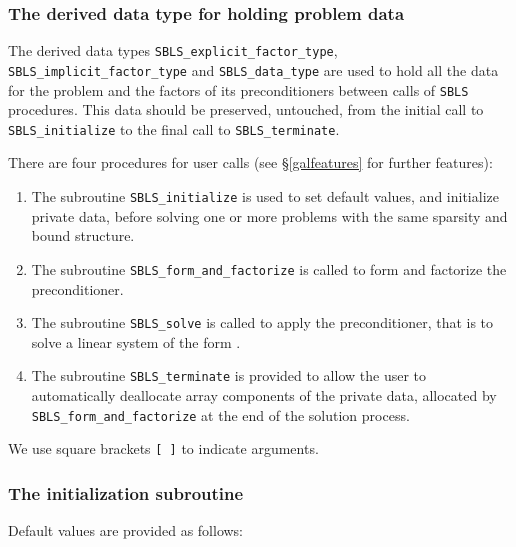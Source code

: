 \documentclass{galahad}
\newcommand{\packagename}{SBLS}
\begin{document}

\subsubsection{The derived data type for holding problem data}\label{typedata}
The derived data types
{\tt \packagename\_explicit\_factor\_type},
{\tt \packagename\_implicit\_factor\_type} and
{\tt \packagename\_data\_type}
are used to hold all the data for the problem and the factors of
its preconditioners between calls of
{\tt \packagename} procedures.
This data should be preserved, untouched, from the initial call to
{\tt \packagename\_initialize}
to the final call to
{\tt \packagename\_terminate}.


\galarguments
There are four procedures for user calls
(see \S\ref{galfeatures} for further features):

\begin{enumerate}
\item The subroutine
      {\tt \packagename\_initialize}
      is used to set default values, and initialize private data,
      before solving one or more problems with the
      same sparsity and bound structure.
\item The subroutine
      {\tt \packagename\_form\_and\_factorize}
      is called to form and factorize the preconditioner.
\item The subroutine
      {\tt \packagename\_solve}
      is called to apply the preconditioner, that is to solve a linear
      system of the form .
\item The subroutine
      {\tt \packagename\_terminate}
      is provided to allow the user to automatically deallocate array
       components of the private data, allocated by
       {\tt \packagename\_form\_and\_factorize}
       at the end of the solution process.
\end{enumerate}
We use square brackets {\tt [ ]} to indicate \optional arguments.


\subsubsection{The initialization subroutine}\label{subinit}
 Default values are provided as follows:
\vspace*{1mm}
\end{document}
